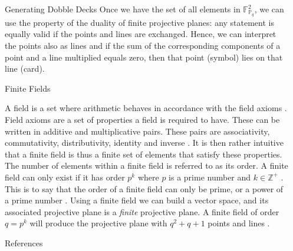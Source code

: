 \documentclass[final]{beamer}
\newlength{\sepwidth}
\newlength{\colwidth}
\newcommand{\separatorcolumn}{\begin{column}{\sepwidth}\end{column}}
\begin{document}
\begin{frame}[t]
\begin{columns}[t]
\begin{column}{\colwidth}
\begin{exampleblock}{Generating Dobble Decks}
    Once we have the set of all elements in $\mathbb{F}^2_{\mathbb{P}_q}$, we can use the property of the duality of finite projective planes: any statement is equally valid if the points and lines are exchanged. Hence, we can interpret the points also as lines and if the sum of the corresponding components of a point and a line multiplied equals zero, then that point (symbol) lies on that line (card).

  \end{exampleblock}

  \begin{block}{Finite Fields}

      A field is a set where arithmetic behaves in accordance with the field axioms \cite{Weisstein2023b}. Field axioms are a set of properties a field is required to have. These can be written in additive and multiplicative pairs. These pairs are associativity, commutativity, distributivity, identity and inverse \cite{Weisstein2023}. It is then rather intuitive that a finite field is thus a finite set of elements that satisfy these properties. The number of elements within a finite field is referred to as its order. A finite field can only exist if it has order $p^k$ where $p$ is a prime number and $k\in\mathbb{Z}^+$ \cite{cameron2000}. This is to say that the order of a finite field can only be prime, or a power of a prime number \cite{cameron2000}. Using a finite field we can build a vector space, and its associated projective plane is a \emph{finite} projective plane. A finite field of order $q=p^k$ will produce the projective plane with $q^2+q+1$ points and lines \cite{Collingridge2018}.

  \end{block}
 
  \begin{block}{References}
    \vspace{-0.25em}
\footnotesize{}
  \end{block}

\end{column}

\separatorcolumn
\end{columns}
\end{frame}
\end{document}
